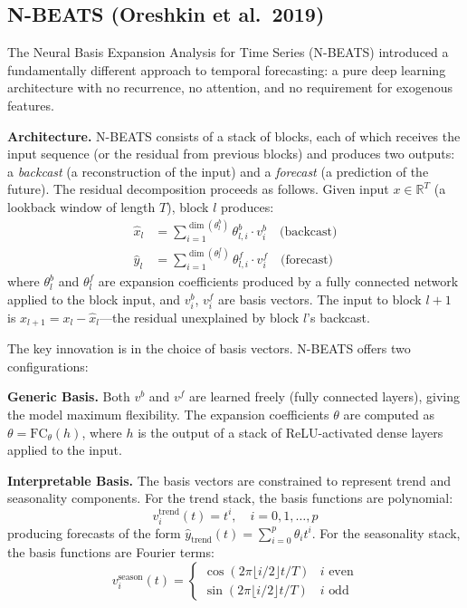 \documentclass[conference]{IEEEtran}
\begin{document}
\subsection{N-BEATS (Oreshkin et al.\ 2019)}

The Neural Basis Expansion Analysis for Time Series (N-BEATS) \cite{oreshkin2019nbeats} introduced a fundamentally different approach to temporal forecasting: a pure deep learning architecture with no recurrence, no attention, and no requirement for exogenous features.

\textbf{Architecture.} N-BEATS consists of a stack of blocks, each of which receives the input sequence (or the residual from previous blocks) and produces two outputs: a \emph{backcast} (a reconstruction of the input) and a \emph{forecast} (a prediction of the future). The residual decomposition proceeds as follows. Given input $x \in \mathbb{R}^{T}$ (a lookback window of length $T$), block $l$ produces:
\begin{align}
\hat{x}_l &= \sum_{i=1}^{\dim(\theta_l^b)} \theta_{l,i}^b \cdot v_i^b \quad \text{(backcast)} \\
\hat{y}_l &= \sum_{i=1}^{\dim(\theta_l^f)} \theta_{l,i}^f \cdot v_i^f \quad \text{(forecast)}
\end{align}
where $\theta_l^b$ and $\theta_l^f$ are expansion coefficients produced by a fully connected network applied to the block input, and $v_i^b$, $v_i^f$ are basis vectors. The input to block $l+1$ is $x_{l+1} = x_l - \hat{x}_l$---the residual unexplained by block $l$'s backcast.

The key innovation is in the choice of basis vectors. N-BEATS offers two configurations:

\textbf{Generic Basis.} Both $v^b$ and $v^f$ are learned freely (fully connected layers), giving the model maximum flexibility. The expansion coefficients $\theta$ are computed as $\theta = \text{FC}_\theta(h)$, where $h$ is the output of a stack of ReLU-activated dense layers applied to the input.

\textbf{Interpretable Basis.} The basis vectors are constrained to represent trend and seasonality components. For the trend stack, the basis functions are polynomial:
\begin{equation}
v_i^{\text{trend}}(t) = t^i, \quad i = 0, 1, \ldots, p
\end{equation}
producing forecasts of the form $\hat{y}_{\text{trend}}(t) = \sum_{i=0}^{p} \theta_i t^i$. For the seasonality stack, the basis functions are Fourier terms:
\begin{equation}
v_i^{\text{season}}(t) = \begin{cases} \cos(2\pi \lfloor i/2 \rfloor t / T) & i \text{ even} \\ \sin(2\pi \lfloor i/2 \rfloor t / T) & i \text{ odd} \end{cases}
\end{equation}
\end{document}
